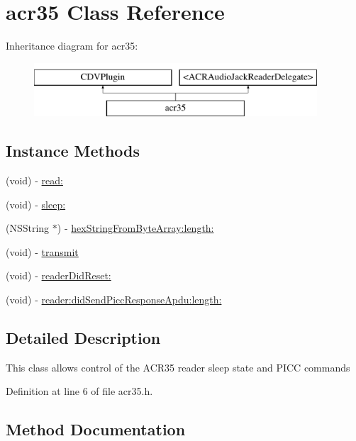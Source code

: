 \hypertarget{interfaceacr35}{}\section{acr35 Class Reference}
\label{interfaceacr35}
Inheritance diagram for acr35\+:\begin{figure}[H]
\begin{center}
\leavevmode
\includegraphics[height=2.000000cm]{interfaceacr35}
\end{center}
\end{figure}
\subsection*{Instance Methods}
\begin{DoxyCompactItemize}
\item 
(void) -\/ \hyperlink{interfaceacr35_a626cea917a3ed7f01f522f4390729ebe}{read\+:}
\item 
(void) -\/ \hyperlink{interfaceacr35_a1fbf70819ba1d99f7bad526db1dd09bb}{sleep\+:}
\item 
(N\+S\+String $\ast$) -\/ \hyperlink{interfaceacr35_a95bec4c2efdc961d463922782cb0bef6}{hex\+String\+From\+Byte\+Array\+:length\+:}
\item 
(void) -\/ \hyperlink{interfaceacr35_af948714c5a31f04672761017195061db}{transmit}
\item 
(void) -\/ \hyperlink{interfaceacr35_a3e59ed5ebaa53c749d418acd314bd144}{reader\+Did\+Reset\+:}
\item 
(void) -\/ \hyperlink{interfaceacr35_a5403cd80aaa20f8fa360b0be8a697d23}{reader\+:did\+Send\+Picc\+Response\+Apdu\+:length\+:}
\end{DoxyCompactItemize}


\subsection{Detailed Description}
This class allows control of the A\+C\+R35 reader sleep state and P\+I\+C\+C commands 

Definition at line 6 of file acr35.\+h.



\subsection{Method Documentation}
\hypertarget{interfaceacr35_a95bec4c2efdc961d463922782cb0bef6}{}
